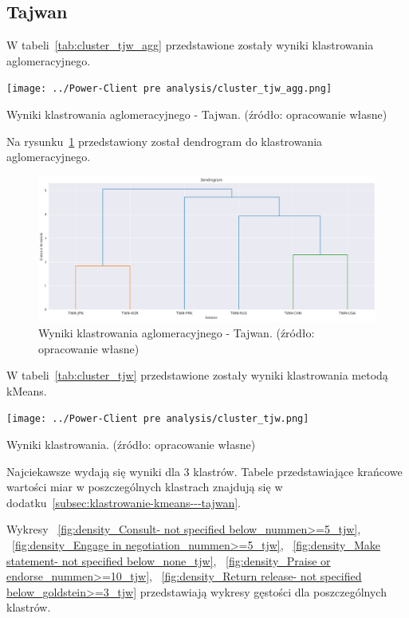 \documentclass[11pt]{report}
\begin{document}
    \subsection{Tajwan}
    W tabeli~\ref{tab:cluster_tjw_agg} przedstawione zostały wyniki klastrowania aglomeracyjnego.
    \begin{table}[!htp]
        \centering
        \texttt{[image: ../Power-Client pre analysis/cluster\_tjw\_agg.png]}
        \caption{Wyniki klastrowania aglomeracyjnego - Tajwan. (źródło: opracowanie własne)}
        \label{tab:cluster_tjw_agg}
    \end{table}
    Na rysunku~\ref{fig:cluster_tjw_agg_dendrogram} przedstawiony został dendrogram do klastrowania aglomeracyjnego.
    \begin{figure}[!htp]
        \centering
        \includegraphics[width=\linewidth]{../Power-Client pre analysis/cluster_tjw_agg_dendrogram.png}
        \caption{Wyniki klastrowania aglomeracyjnego - Tajwan. (źródło: opracowanie własne)}
        \label{fig:cluster_tjw_agg_dendrogram}
    \end{figure}

    W tabeli~\ref{tab:cluster_tjw} przedstawione zostały wyniki klastrowania metodą kMeans.
    \begin{table}[!htp]
        \centering
        \texttt{[image: ../Power-Client pre analysis/cluster\_tjw.png]}
        \caption{Wyniki klastrowania. (źródło: opracowanie własne)}
        \label{tab:cluster_tjw}
    \end{table}

    Najciekawsze wydają się wyniki dla 3 klastrów.
    Tabele przedstawiające krańcowe wartości miar w poszczególnych klastrach znajdują się w dodatku~\ref{subsec:klastrowanie-kmeans---tajwan}.

    Wykresy
    ~\ref{fig:density_Consult- not specified below_nummen>=5_tjw},
    ~\ref{fig:density_Engage in negotiation_nummen>=5_tjw},
    ~\ref{fig:density_Make statement- not specified below_none_tjw},
    ~\ref{fig:density_Praise or endorse_nummen>=10_tjw},
    ~\ref{fig:density_Return release- not specified below_goldstein>=3_tjw}
    przedstawiają wykresy gęstości dla poszczególnych klastrów.
\end{document}
